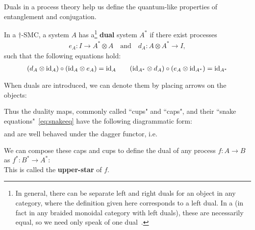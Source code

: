 Duals in a process theory help us define the quantum-like properties of entanglement and conjugation.

\begin{defn}
\label{def:dual}
In a $\dagger$-SMC, a system $A$ has a\footnote{In general, there can be separate left and right duals for an object in any category, where the definition given here corresponds to a left dual. In a \dsmc(in fact in any braided monoidal category with left duals), these are necessarily equal, so we need only speak of one dual~\cite[Prop.~7.2]{joyal1993braided}. } \textbf{dual} system $A^*$ if there exist processes 
\begin{align}
e_A:I\to A^*\otimes A \quad \mbox{and}\quad d_A:A\otimes A^*\to I,
\end{align}
such that the following equations hold:
\begin{align}
\label{eq:snakeeq}
(d_A\otimes \mbox{id}_{A})\circ(\mbox{id}_{A}\otimes e_A) = \mbox{id}_{A} \qquad (\mbox{id}_{A^*}\otimes d_A)\circ(e_A\otimes \mbox{id}_{A^*})=\mbox{id}_{A^*}
\end{align}
\end{defn}

When duals are introduced, we can denote them by placing arrows on the objects:
\begin{equation}

\end{equation}

Thus the duality maps, commonly called ``cups" and ``caps", and their ``snake equations"~\eqref{eq:snakeeq} have the following diagrammatic form:
\begin{align}

\end{align}
\begin{equation}
\label{eq:snake}

\end{equation} 
\noindent and are well behaved under the dagger functor, i.e.
\begin{equation}

\end{equation}

We can compose these caps and cups to define the dual of any process $f:A\to B$ as $f^*:B^*\to A^*$:
\begin{equation}
\label{eq:dualmorph}

\end{equation}
This is called the \textbf{upper-star} of $f$.

